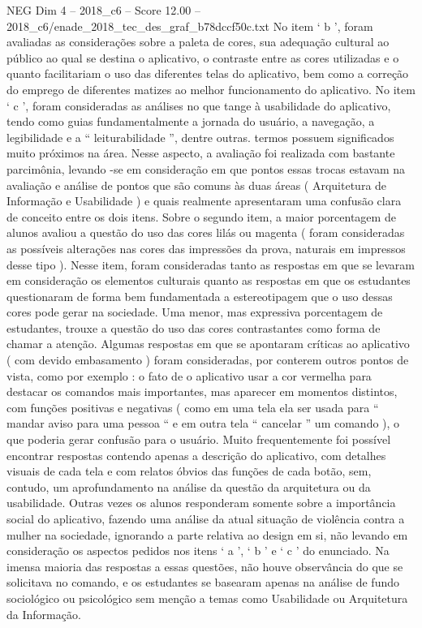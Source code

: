 \begin{textsample}{NEG Dim 4 – 2018\_c6 – Score 12.00 – 2018\_c6/enade\_2018\_tec\_des\_graf\_b78dccf50c.txt}
No item ‘ b ’, foram avaliadas as considerações sobre a paleta de cores, sua adequação cultural ao público ao qual se destina o aplicativo, o contraste entre as cores utilizadas e o quanto facilitariam o uso das diferentes telas do aplicativo, bem como a correção do emprego de diferentes matizes ao melhor funcionamento do aplicativo.
No item ‘ c ’, foram consideradas as análises no que tange à usabilidade do aplicativo, tendo como guias fundamentalmente a jornada do usuário, a navegação, a legibilidade e a “ leiturabilidade ”, dentre outras. termos possuem significados muito próximos na área.
Nesse aspecto, a avaliação foi realizada com bastante parcimônia, levando -se em consideração em que pontos essas trocas estavam na avaliação e análise de pontos que são comuns às duas áreas ( Arquitetura de Informação e Usabilidade ) e quais realmente apresentaram uma confusão clara de conceito entre os dois itens.
Sobre o segundo item, a maior porcentagem de alunos avaliou a questão do uso das cores lilás ou magenta ( foram consideradas as possíveis alterações nas cores das impressões da prova, naturais em impressos desse tipo ).
Nesse item, foram consideradas tanto as respostas em que se levaram em consideração os elementos culturais quanto as respostas em que os estudantes questionaram de forma bem fundamentada a estereotipagem que o uso dessas cores pode gerar na sociedade.
Uma menor, mas expressiva porcentagem de estudantes, trouxe a questão do uso das cores contrastantes como forma de chamar a atenção.
Algumas respostas em que se apontaram críticas ao aplicativo ( com devido embasamento ) foram consideradas, por conterem outros pontos de vista, como por exemplo : o fato de o aplicativo usar a cor vermelha para destacar os comandos mais importantes, mas aparecer em momentos distintos, com funções positivas e negativas ( como em uma tela ela ser usada para “ mandar aviso para uma pessoa “ e em outra tela “ cancelar ” um comando ), o que poderia gerar confusão para o usuário.
Muito frequentemente foi possível encontrar respostas contendo apenas a descrição do aplicativo, com detalhes visuais de cada tela e com relatos óbvios das funções de cada botão, sem, contudo, um aprofundamento na análise da questão da arquitetura ou da usabilidade.
Outras vezes os alunos responderam somente sobre a importância social do aplicativo, fazendo uma análise da atual situação de violência contra a mulher na sociedade, ignorando a parte relativa ao design em si, não levando em consideração os aspectos pedidos nos itens ‘ a ’, ‘ b ’ e ‘ c ’ do enunciado.
Na imensa maioria das respostas a essas questões, não houve observância do que se solicitava no comando, e os estudantes se basearam apenas na análise de fundo sociológico ou psicológico sem menção a temas como Usabilidade ou Arquitetura da Informação.

\end{textsample}
